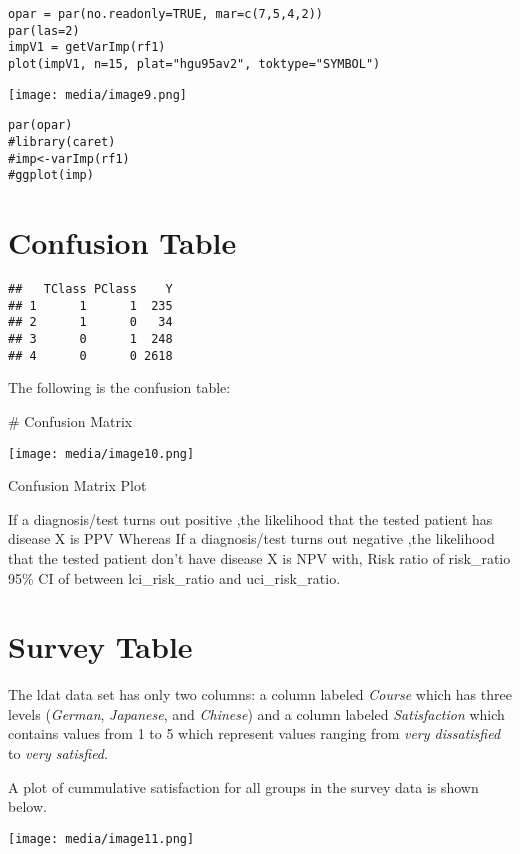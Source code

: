 \begin{verbatim}
opar = par(no.readonly=TRUE, mar=c(7,5,4,2))
par(las=2)
impV1 = getVarImp(rf1)
plot(impV1, n=15, plat="hgu95av2", toktype="SYMBOL")
\end{verbatim}

\texttt{[image: media/image9.png]}

\begin{verbatim}
par(opar)
#library(caret)
#imp<-varImp(rf1)
#ggplot(imp)
\end{verbatim}

\hypertarget{confusion-table}{%
\section{Confusion Table}\label{confusion-table}}

\begin{verbatim}
##   TClass PClass    Y
## 1      1      1  235
## 2      1      0   34
## 3      0      1  248
## 4      0      0 2618
\end{verbatim}

The following is the confusion table:

\# Confusion Matrix

\texttt{[image: media/image10.png]}

Confusion Matrix Plot

If a diagnosis/test turns out positive ,the likelihood that the tested
patient has disease X is PPV Whereas If a diagnosis/test turns out
negative ,the likelihood that the tested patient don't have disease X is
NPV with, Risk ratio of risk\_ratio 95\% CI of between lci\_risk\_ratio
and uci\_risk\_ratio.

\hypertarget{survey-table}{%
\section{Survey Table}\label{survey-table}}

The ldat data set has only two columns: a column labeled \emph{Course}
which has three levels (\emph{German}, \emph{Japanese}, and
\emph{Chinese}) and a column labeled \emph{Satisfaction} which contains
values from 1 to 5 which represent values ranging from \emph{very
dissatisfied} to \emph{very satisfied}.

A plot of cummulative satisfaction for all groups in the survey data is
shown below.

\texttt{[image: media/image11.png]}

